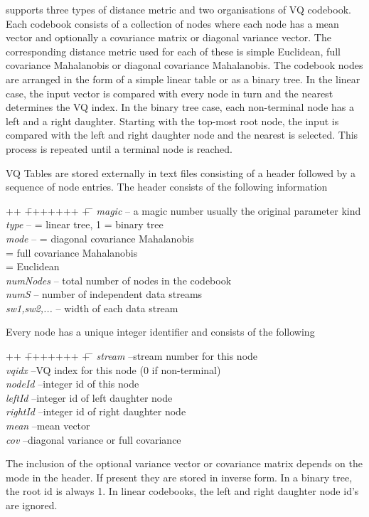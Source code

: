  supports three types of distance metric and two organisations of
VQ codebook.   Each codebook consists of a collection of nodes where each
node has a mean vector and optionally a covariance matrix or diagonal
variance vector.  The corresponding distance metric used for  each of these
is simple Euclidean,  full covariance Mahalanobis or diagonal covariance
Mahalanobis. The codebook nodes are  arranged in 
the form of a simple linear table
or as a  binary tree. In the linear case, the input vector is compared with
every node in turn and the nearest determines the VQ index.  In the binary
tree case, each non-terminal node has a left and a right daughter.  Starting
with the top-most root node,  the input is compared with the left and right
daughter node and the nearest is selected.  This process is repeated until a
terminal node is reached. 
 

VQ Tables are stored externally in text files consisting of a header
followed by a sequence of node entries.  The header consists of the
following information
\begin{tabbing}
++ \= +++++++ \= + \= \kill
\> \textit{magic}\>  --\> a magic number usually the original parameter kind \\
\> \textit{type} \>  -- = linear tree, 1 = binary tree \\
\> \textit{mode} \>  -- = diagonal covariance Mahalanobis \\
\>\> = full covariance Mahalanobis \\
\>\> = Euclidean \\
\> \textit{numNodes} \> --\>  total number of nodes in the codebook \\
\> \textit{numS}\>  --\> number of independent data streams \\
\> \textit{sw1,sw2,...}\>  --\> width of each data stream \\
\end{tabbing}
Every node has a unique integer identifier and consists of the 
following
\begin{tabbing}
++ \= +++++++ \= + \= \kill
\> \textit{stream}\>  --\>stream number for this node \\
\> \textit{vqidx}\>  --\>VQ index for this node (0 if non-terminal) \\
\> \textit{nodeId}\>  --\>integer id of this node \\
\> \textit{leftId}\>  --\>integer id of left daughter node \\
\> \textit{rightId}\>  --\>integer id of right daughter node \\
\> \textit{mean}\>  --\>mean vector \\
\> \textit{cov}\>  --\>diagonal variance or full covariance \\
\end{tabbing}
The inclusion of the optional variance vector or covariance matrix depends
on the mode in the header.  If present they are stored in inverse form.
In a binary tree, the root id is always 1.  In linear codebooks, the
left and right daughter node id's are ignored.


